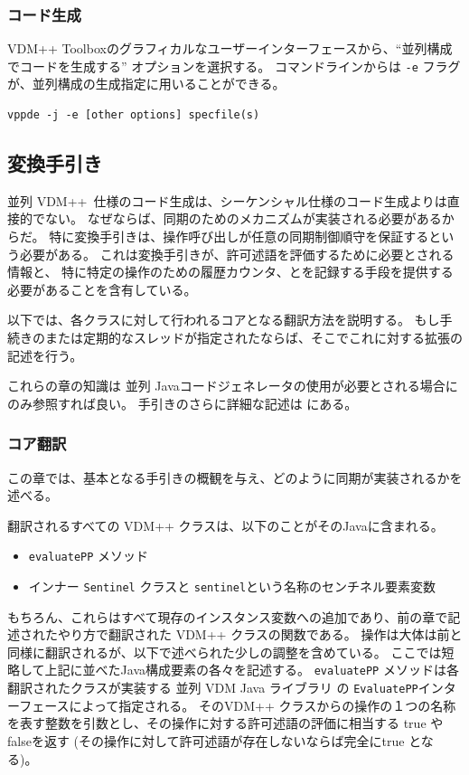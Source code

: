 \documentclass[\pformat,11pt]{jarticle}
\newcommand{\ToolboxName}{VDM++ Toolbox}
\newcommand{\VDM}{VDM++}
\newcommand{\cg}{Javaコードジェネレータ}
\newcommand{\ccg}{並列 \cg}
\newcommand{\CJL}{並列 VDM Java ライブラリ}
\begin{document}
\subsubsection{コード生成}
 \ToolboxName のグラフィカルなユーザーインターフェースから、``並列構成でコードを生成する'' オプションを選択する。
コマンドラインからは \texttt{-e} フラグが、並列構成の生成指定に用いることができる。
\begin{screen}
\begin{verbatim}
vppde -j -e [other options] specfile(s)
\end{verbatim}
\end{screen}

\subsection{変換手引き}
並列 \VDM\ 仕様のコード生成は、シーケンシャル仕様のコード生成よりは直接的でない。
なぜならば、同期のためのメカニズムが実装される必要があるからだ。
特に変換手引きは、操作呼び出しが任意の同期制御順守を保証するという必要がある。
これは変換手引きが、許可述語を評価するために必要とされる情報と、
特に特定の操作のための履歴カウンタ、とを記録する手段を提供する必要があることを含有している。

以下では、各クラスに対して行われるコアとなる翻訳方法を説明する。
もし手続きのまたは定期的なスレッドが指定されたならば、そこでこれに対する拡張の記述を行う。

これらの章の知識は \ccg の使用が必要とされる場合にのみ参照すれば良い。
手引きのさらに詳細な記述は \cite{Oppitz99-SCSK}にある。

\subsubsection{コア翻訳}

この章では、基本となる手引きの概観を与え、どのように同期が実装されるかを述べる。

翻訳されるすべての VDM++ クラスは、以下のことがそのJavaに含まれる。
\begin{itemize}
\item  \texttt{evaluatePP} メソッド
\item インナー \texttt{Sentinel} クラスと \texttt{sentinel}という名称のセンチネル要素変数
\end{itemize}
もちろん、これらはすべて現存のインスタンス変数への追加であり、前の章で記述されたやり方で翻訳された VDM++ クラスの関数である。
操作は大体は前と同様に翻訳されるが、以下で述べられた少しの調整を含めている。
ここでは短略して上記に並べたJava構成要素の各々を記述する。
 \texttt{evaluatePP} メソッドは各翻訳されたクラスが実装する \CJL{} の \texttt{EvaluatePP}インターフェースによって指定される。
そのVDM++ クラスからの操作の１つの名称を表す整数を引数とし、その操作に対する許可述語の評価に相当する true や falseを返す (その操作に対して許可述語が存在しないならば完全にtrue となる)。 
\end{document}
